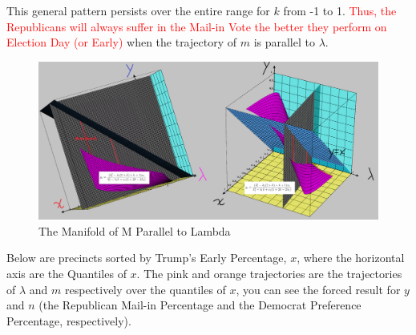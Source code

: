 This general pattern persists over the entire range for $k$ from -1 to 1. \textcolor{red}{Thus, the Republicans will always suffer in the Mail-in Vote the better they perform on Election Day (or Early)} when the trajectory of $m$ is parallel to $\lambda$.
\begin{figure}[bp!]
\begin{center}
\caption{The Manifold of M Parallel to Lambda}
\includegraphics[width=400pt]{Parallel Lambda M parametric.png}
\end{center}
\end{figure}
\newpage
Below are precincts sorted by Trump's Early Percentage, $x$, where the horizontal axis are the Quantiles of $x$. The pink and orange trajectories are the trajectories of $\lambda$ and $m$ respectively over the quantiles of $x$, you can see the forced result for $y$ and $n$ (the Republican Mail-in Percentage and the Democrat Preference Percentage, respectively).


